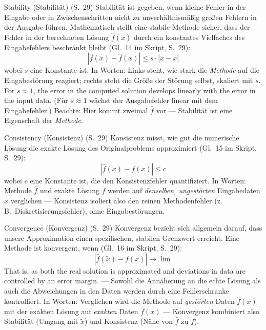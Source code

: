 \begin{defbox}{Stability (Stabilität) (S.~29)}
Stabilität ist gegeben, wenn kleine Fehler in der Eingabe oder in Zwischenschritten nicht zu unverhältnismäßig großen Fehlern in der Ausgabe führen. Mathematisch stellt eine stabile Methode sicher, dass der Fehler in der berechneten Lösung $\hat{f}(\tilde{x})$ durch ein konstantes Vielfaches des Eingabefehlers beschränkt bleibt (Gl.~14 im Skript, S.~29):
\[ \left| \hat{f}(\tilde{x}) - \hat{f}(x) \right| \leq s \cdot \left| \tilde{x} - x \right| \tag{Gl.~14} \]
wobei $s$ eine Konstante ist. In Worten: Links steht, wie stark die \emph{Methode} auf die Eingabestörung reagiert; rechts steht die Größe der Störung selbst, skaliert mit $s$. \glqq For $s \approx 1$, the error in the computed solution develops linearly with the error in the input data.\grqq{} (Für $s \approx 1$ wächst der Ausgabefehler linear mit dem Eingabefehler.) Beachte: Hier kommt zweimal $\hat{f}$ vor — Stabilität ist eine Eigenschaft der \emph{Methode}.
\end{defbox}

\begin{defbox}{Consistency (Konsistenz) (S.~29)}
Konsistenz misst, wie gut die numerische Lösung die exakte Lösung des Originalproblems approximiert (Gl.~15 im Skript, S.~29):
\[ \left| \hat{f}(x) - f(x) \right| \leq c \tag{Gl.~15} \]
wobei $c$ eine Konstante ist, die den Konsistenzfehler quantifiziert. In Worten: Methode $\hat{f}$ und exakte Lösung $f$ werden auf \emph{denselben, ungestörten} Eingabedaten $x$ verglichen — Konsistenz isoliert also den reinen Methodenfehler (z.\,B.\ Diskretisierungsfehler), ohne Eingabestörungen.
\end{defbox}

\begin{defbox}{Convergence (Konvergenz) (S.~29)}
Konvergenz bezieht sich allgemein darauf, dass unsere Approximation einen spezifischen, stabilen Grenzwert erreicht. Eine Methode ist konvergent, wenn (Gl.~16 im Skript, S.~29):
\[ \left| \hat{f}(\tilde{x}) - f(x) \right| \to \lim \tag{Gl.~16} \]
\glqq That is, as both the real solution is approximated and deviations in data are controlled by an error margin.\grqq{} — Sowohl die Annäherung an die echte Lösung als auch die Abweichungen in den Daten werden durch eine Fehlerschranke kontrolliert. In Worten: Verglichen wird die Methode auf \emph{gestörten} Daten $\hat{f}(\tilde{x})$ mit der exakten Lösung auf \emph{exakten} Daten $f(x)$ — Konvergenz kombiniert also Stabilität (Umgang mit $\tilde{x}$) und Konsistenz (Nähe von $\hat{f}$ zu $f$).
\end{defbox}

